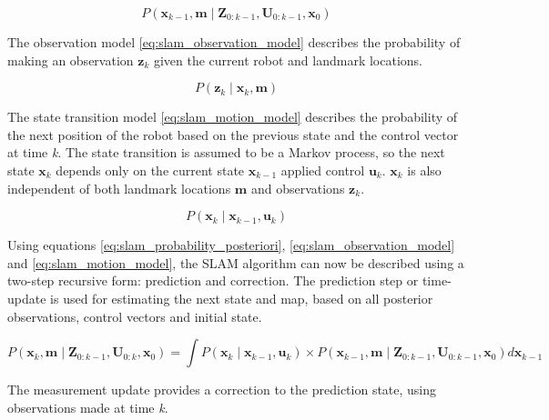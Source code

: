 \begin{equation} \label{eq:slam_probability_posteriori}
    P\left ( \mathbf{x}_{k-1},\mathbf{m}\mid \mathbf{Z}_{0:k-1},\mathbf{U}_{0:k-1},\mathbf{x}_{0}\right )
\end{equation}

The observation model \ref{eq:slam_observation_model} describes the probability of making an observation 
$\mathbf{z}_{k}$ given the current robot and landmark locations.

\begin{equation} \label{eq:slam_observation_model}
    P\left ( \mathbf{z}_{k}\mid \mathbf{x}_{k},\mathbf{m} \right )
\end{equation}

The state transition model \ref{eq:slam_motion_model} describes the probability of the next position of the robot 
based on the previous state and the control vector at time \emph{k}. The state transition is assumed to be a Markov
process, so the next state $\mathbf{x}_{k}$ depends only on the current state $\mathbf{x}_{k-1}$ applied control 
$\mathbf{u}_{k}$. $\mathbf{x}_{k}$ is also independent of both landmark locations $\mathbf{m}$ and observations
$\mathbf{z}_{k}$.

\begin{equation} \label{eq:slam_motion_model}
    P\left ( \mathbf{x}_{k}\mid \mathbf{x}_{k-1},\mathbf{u}_{k} \right )
\end{equation}

Using equations \ref{eq:slam_probability_posteriori}, \ref{eq:slam_observation_model} and \ref{eq:slam_motion_model},
the SLAM algorithm can now be described using a two-step recursive form: prediction and correction.
The prediction step or time-update is used for estimating the next state and map, based on all posterior observations,
control vectors and initial state. 

\begin{equation} \label{eq:slam_time_update}
    P\left ( \mathbf{x}_{k}, \mathbf{m}\mid \mathbf{Z}_{0:k-1}, \mathbf{U}_{0:k}, \mathbf{x}_{0} \right )=
        \int 
            P\left ( \mathbf{x}_{k}\mid \mathbf{x}_{k-1}, \mathbf{u}_{k} \right ) 
            \times  
            P\left ( \mathbf{x}_{k-1}, \mathbf{m}  \mid  \mathbf{Z}_{0:k-1}, \mathbf{U}_{0:k-1}, \mathbf{x}_{0}\right )
        d\mathbf{x}_{k-1}
\end{equation}

The measurement update provides a correction to the prediction state, using observations made at time \emph{k}.

